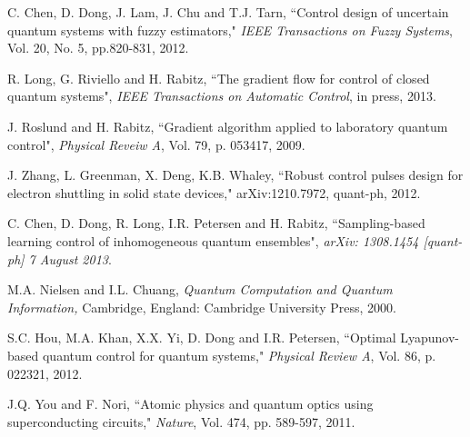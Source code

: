 \documentclass[letterpaper, 10 pt, conference]{ieeeconf}
\begin{document}
\begin{thebibliography}{99}
C. Chen, D. Dong, J. Lam, J. Chu and T.J. Tarn, ``Control design of
uncertain quantum systems with fuzzy estimators," \emph{IEEE
Transactions on Fuzzy Systems}, Vol. 20, No. 5, pp.820-831, 2012.

R. Long, G. Riviello and H. Rabitz, ``The gradient flow for control of closed quantum systems", \emph{IEEE Transactions on
Automatic Control}, in press, 2013.

J. Roslund and H. Rabitz, ``Gradient algorithm applied to
laboratory quantum control", \emph{Physical Reveiw A}, Vol. 79, p.
053417, 2009.


J. Zhang, L. Greenman, X. Deng, K.B. Whaley, ``Robust control pulses
design for electron shuttling in solid state devices,"
arXiv:1210.7972, quant-ph, 2012.

C. Chen, D. Dong, R. Long, I.R. Petersen and H. Rabitz, ``Sampling-based learning control of inhomogeneous quantum ensembles",
\emph{arXiv: 1308.1454 [quant-ph] 7 August 2013}.

M.A. Nielsen and I.L. Chuang, {\em Quantum Computation and Quantum
Information,} Cambridge, England: Cambridge University Press, 2000.

S.C. Hou, M.A. Khan, X.X. Yi, D. Dong and I.R. Petersen, ``Optimal
Lyapunov-based quantum control for quantum systems," {\em Physical
Review A}, Vol. 86, p. 022321, 2012.

J.Q. You and F. Nori, ``Atomic physics and quantum optics using superconducting circuits," {\em Nature}, Vol. 474, pp. 589-597, 2011.





























\end{thebibliography}
\end{document}
